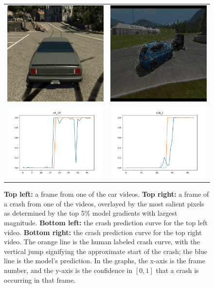 \documentclass[letterpaper, twocolumn]{article} %
\begin{document}
\begin{figure}
\begin{tabular}{c c}
\includegraphics[width=0.45\columnwidth]{figures/v4_19_0.png} &
\includegraphics[width=0.45\columnwidth]{figures/v18_2_42.png}  \\
\includegraphics[width=0.45\columnwidth]{figures/v4_19_plot.png} &
\includegraphics[width=0.45\columnwidth]{figures/v18_2_plot.png} 
\end{tabular}
\caption{\textbf{Top left:} a frame from one of the car videos. \textbf{Top right:} a frame of a crash from one of the videos, overlayed by the most salient pixels as determined by the top 5\% model gradients with largest magnitude. \textbf{Bottom left:} the crash prediction curve for the top left video. \textbf{Bottom right:} the crash prediction curve for the top right video. The orange line is the human labeled crash curve, with the vertical jump signifying the approximate start of the crash; the blue line is the model's prediction. In the graphs, the x-axis is the frame number, and the y-axis is the confidence in $[0,1]$ that a crash is occurring in that frame.}

\end{figure}
\end{document}
